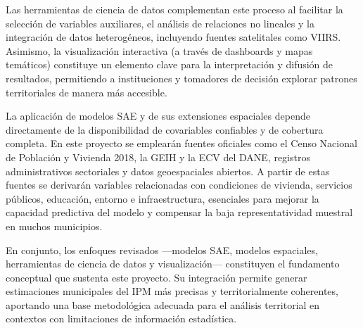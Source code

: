 Las herramientas de ciencia de datos complementan este proceso al facilitar la selección de variables auxiliares, el análisis de relaciones no lineales y la integración de datos heterogéneos, incluyendo fuentes satelitales como VIIRS. Asimismo, la visualización interactiva (a través de dashboards y mapas
temáticos) constituye un elemento clave para la interpretación y difusión de resultados, permitiendo a instituciones y tomadores de decisión explorar patrones territoriales de manera más accesible.

La aplicación de modelos SAE y de sus extensiones espaciales depende directamente de la disponibilidad de covariables confiables y de cobertura completa. En este proyecto se emplearán fuentes oficiales como el Censo Nacional de Población y Vivienda 2018, la GEIH y la ECV del DANE, registros administrativos sectoriales y datos geoespaciales abiertos. A partir de estas fuentes se derivarán variables relacionadas con condiciones de vivienda, servicios públicos, educación, entorno e infraestructura, esenciales para mejorar la capacidad predictiva del modelo y compensar la baja representatividad muestral en muchos
municipios.

En conjunto, los enfoques revisados —modelos SAE, modelos espaciales, herramientas de ciencia de datos y visualización— constituyen el fundamento conceptual que sustenta este proyecto. Su
integración permite generar estimaciones municipales del IPM más precisas y territorialmente coherentes, aportando una base metodológica adecuada para el análisis territorial en contextos con
limitaciones de información estadística.



    
